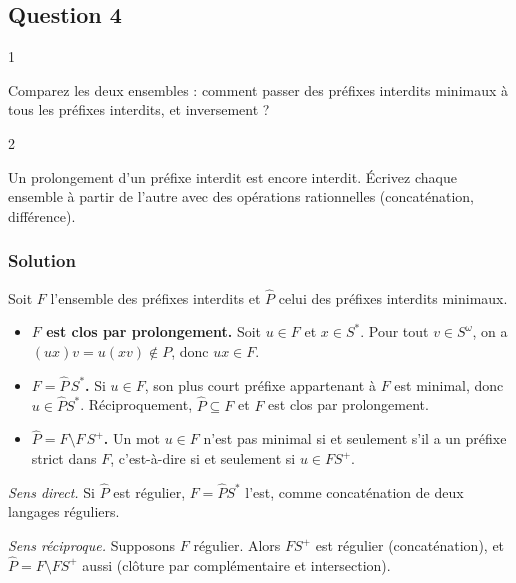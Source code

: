 \documentclass[11pt,a4paper]{article}
\providecommand{\tightlist}{\setlength{\itemsep}{0pt}\setlength{\parskip}{0pt}}
\begin{document}
\hypertarget{question-4}{%
\subsection{Question 4}\label{question-4}}

\begin{indication}{1}

Comparez les deux ensembles : comment passer des préfixes interdits minimaux à tous les préfixes interdits, et inversement ?

\end{indication}

\begin{indication}{2}

Un prolongement d'un préfixe interdit est encore interdit. Écrivez chaque ensemble à partir de l'autre avec des opérations rationnelles (concaténation, différence).

\end{indication}

\hypertarget{solution-3}{%
\subsubsection{Solution}\label{solution-3}}

Soit \(F\) l'ensemble des préfixes interdits et \(\hat P\) celui des préfixes interdits minimaux.

\begin{itemize}
\tightlist
\item
  \textbf{\(F\) est clos par prolongement.} Soit \(u\in F\) et \(x\in S^*\). Pour tout \(v\in S^\omega\), on a \((ux)v=u(xv)\notin P\), donc \(ux\in F\).
\item
  \textbf{\(F=\hat P\,S^*\).} Si \(u\in F\), son plus court préfixe appartenant à \(F\) est minimal, donc \(u\in\hat P S^*\). Réciproquement, \(\hat P\subseteq F\) et \(F\) est clos par prolongement.
\item
  \textbf{\(\hat P=F\setminus F\,S^+\).} Un mot \(u\in F\) n'est pas minimal si et seulement s'il a un préfixe strict dans \(F\), c'est-à-dire si et seulement si \(u\in F S^+\).
\end{itemize}

\emph{Sens direct.} Si \(\hat P\) est régulier, \(F=\hat PS^*\) l'est, comme concaténation de deux langages réguliers.

\emph{Sens réciproque.} Supposons \(F\) régulier. Alors \(FS^+\) est régulier (concaténation), et \(\hat P=F\setminus FS^+\) aussi (clôture par complémentaire et intersection).
\end{document}
